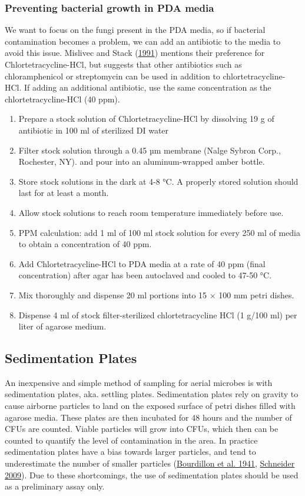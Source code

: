 \documentclass{sop_class}[overrideChapters] %
\providecommand{\tightlist}{%
  \setlength{\itemsep}{0pt}\setlength{\parskip}{0pt}}
\begin{document}
{{\subsubsection{Preventing bacterial growth in PDA media}\label{pda-antibio}}

We want to focus on the fungi present in the PDA media, so if bacterial
contamination becomes a problem, we can add an antibiotic to the media
to avoid this issue. Mislivec and Stack (\protect\hyperlink{ref-Mislivec1991}{1991}) mentions their preference for
Chlortetracycline-HCl, but suggests that other antibiotics such as
chloramphenicol or streptomycin can be used in addition to
chlortetracycline-HCl. If adding an additional antibiotic, use the same
concentration as the chlortetracycline-HCl (40 ppm).
\begin{enumerate}
\def\labelenumi{\arabic{enumi}.}
\tightlist
\item
  Prepare a stock solution of Chlortetracycline-HCl by dissolving 19 g
  of antibiotic in 100 ml of sterilized DI water
\item
  Filter stock solution through a 0.45 µm membrane (Nalge Sybron
  Corp., Rochester, NY). and pour into an aluminum-wrapped amber
  bottle.
\item
  Store stock solutions in the dark at 4-8 °C. A properly stored
  solution should last for at least a month.
\item
  Allow stock solutions to reach room temperature immediately before
  use.
\item
  PPM calculation: add 1 ml of 100 ml stock solution for every 250 ml
  of media to obtain a concentration of 40 ppm.
\item
  Add Chlortetracycline-HCl to PDA media at a rate of 40 ppm (final
  concentration) after agar has been autoclaved and cooled to 47-50
  °C.
\item
  Mix thoroughly and dispense 20 ml portions into 15 × 100 mm petri
  dishes.
\item
  Dispense 4 ml of stock filter-sterilized chlortetracycline HCl (1
  g/100 ml) per liter of agarose medium.
\end{enumerate}
\hypertarget{gravity-testing}{%
\subsection{Sedimentation Plates}\label{gravity-testing}}

An inexpensive and simple method of sampling for aerial microbes is with
sedimentation plates, aka. settling plates. Sedimentation plates rely on
gravity to cause airborne particles to land on the exposed surface of
petri dishes filled with agarose media. These plates are then incubated
for 48 hours and the number of CFUs are counted. Viable particles will
grow into CFUs, which then can be counted to quantify the level of
contamination in the area. In practice sedimentation plates have a bias
towards larger particles, and tend to underestimate the number of
smaller particles (\protect\hyperlink{ref-Bourdillon1941}{Bourdillon et al. 1941}, \protect\hyperlink{ref-Schneider2009}{Schneider 2009}). Due to these
shortcomings, the use of sedimentation plates should be used as a
preliminary assay only.

}
\end{document}
